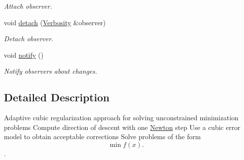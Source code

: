 \begin{DoxyCompactItemize}
\begin{DoxyCompactList}\small\item\em Attach observer. \end{DoxyCompactList}\item 
\hypertarget{classSpacy_1_1Mixin_1_1MixinConnection_adda739590c487679c26f60e50aedb73f}{void \hyperlink{classSpacy_1_1Mixin_1_1MixinConnection_adda739590c487679c26f60e50aedb73f}{detach} (\hyperlink{classSpacy_1_1Mixin_1_1Verbosity_aefe2f237b0456c4bced001fbfa75f92e}{Verbosity} \&observer)}\label{classSpacy_1_1Mixin_1_1MixinConnection_adda739590c487679c26f60e50aedb73f}

\begin{DoxyCompactList}\small\item\em Detach observer. \end{DoxyCompactList}\item 
\hypertarget{classSpacy_1_1Mixin_1_1MixinConnection_a1ddeaa78a3bb4a38c2cca36d1f99fe36}{void \hyperlink{classSpacy_1_1Mixin_1_1MixinConnection_a1ddeaa78a3bb4a38c2cca36d1f99fe36}{notify} ()}\label{classSpacy_1_1Mixin_1_1MixinConnection_a1ddeaa78a3bb4a38c2cca36d1f99fe36}

\begin{DoxyCompactList}\small\item\em Notify observers about changes. \end{DoxyCompactList}\end{DoxyCompactItemize}


\subsection{Detailed Description}
Adaptive cubic regularization approach for solving unconstrained minimization problems Compute direction of descent with one \hyperlink{namespaceSpacy_1_1Newton}{Newton} step Use a cubic error model to obtain acceptable corrections Solve problems of the form \[\min f(x).\]. 

